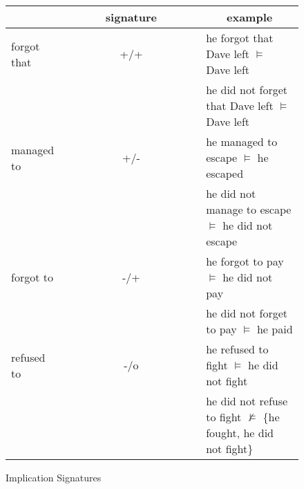 \begin{figure}
\begin{center}
  \begin{tabular}{l c l}
    \hline
   	 & ~~~~~~signature~~~~~~ &  \multicolumn{1}{c}{example} \\
   	\hline
   	forgot that      & +/+ & he forgot that Dave left $\vDash$ Dave left \\
   	                 &     & he did not forget that Dave left $\vDash$ Dave left \\
   	\hline
   	managed to       & +/- & he managed to escape $\vDash$ he escaped \\
   	                 &     & he did not manage to escape $\vDash$ he did not escape \\
   	\hline
   	forgot to        & -/+ & he forgot to pay $\vDash$ he did not pay \\
   	                 &     & he did not forget to pay $\vDash$ he paid \\
   	\hline
   	refused to       & -/o & he refused to fight $\vDash$ he did not fight \\
   	                 &     & he did not refuse to fight $\nvDash$ \{he fought, he did not fight\} \\
   	\hline
  \end{tabular}
\end{center}
\caption{Implication Signatures}
\label{fig:imp-sig}
\end{figure}


